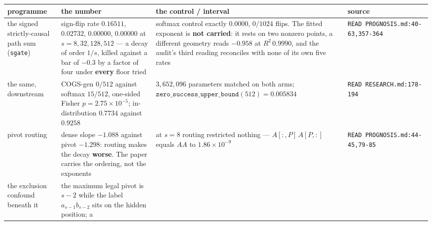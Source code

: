 \documentclass[11pt,a4paper]{article}
\newcounter{none}                 %
\theoremstyle{plain}
\theoremstyle{definition}
\theoremstyle{remark}
\begin{document}
{\def\LTcaptype{none} %
\begin{longtable}[]{@{}
  >{\raggedright\arraybackslash}p{}
  >{\raggedright\arraybackslash}p{}
  >{\raggedright\arraybackslash}p{}
  >{\raggedright\arraybackslash}p{}@{}}
\toprule\noalign{}
\begin{minipage}[b]{\linewidth}\raggedright
programme
\end{minipage} & \begin{minipage}[b]{\linewidth}\raggedright
the number
\end{minipage} & \begin{minipage}[b]{\linewidth}\raggedright
the control / interval
\end{minipage} & \begin{minipage}[b]{\linewidth}\raggedright
source
\end{minipage} \\
\midrule\noalign{}
\endhead
\bottomrule\noalign{}
\endlastfoot
the signed strictly-causal path sum (\texttt{sgate}) & sign-flip rate
\(0.16511\), \(0.02732\), \(0.00000\), \(0.00000\) at \(s=8,32,128,512\)
--- a decay of order \(1/s\), killed against a bar of \(-0.3\) by a
factor of four under \textbf{every} floor tried & softmax control
exactly \(0.0000\), \(0/1024\) flips. The fitted exponent is \textbf{not
carried}: it rests on two nonzero points, a different geometry reads
\(-0.958\) at \(R^{2}\,0.9990\), and the audit's third reading
reconciles with none of its own five rates &
\texttt{READ\ PROGNOSIS.md:40-63,357-364} \\
the same, downstream & COGS-gen \textbf{\(0/512\)} against softmax
\(15/512\), one-sided Fisher \(p=2.75\times10^{-5}\); in-distribution
\(0.7734\) against \(0.9258\) & \(3{,}652{,}096\) parameters matched on
both arms; \(\texttt{zero\_success\_upper\_bound}(512)=0.005834\) &
\texttt{READ\ RESEARCH.md:178-194} \\
pivot routing & dense slope \(-1.088\) against pivot \(-1.298\): routing
makes the decay \textbf{worse}. The paper carries the ordering, not the
exponents & at \(s=8\) routing restricted nothing --- \(A[:,P]\,A[P,:]\)
equals \(AA\) to \(1.86\times10^{-9}\) &
\texttt{READ\ PROGNOSIS.md:44-45,79-85} \\
the exclusion confound beneath it & the maximum legal pivot is \(s-2\)
while the label \(a_{s-1}b_{s-2}\) sits on the hidden position; a

\end{longtable}}
\end{document}
